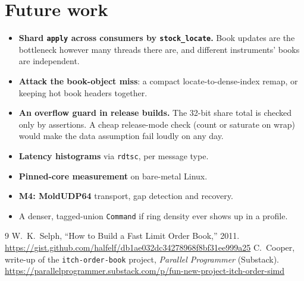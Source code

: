 \documentclass[10pt,a4paper]{article}
\newcommand{\code}[1]{\texttt{#1}}
\begin{document}
\section{Future work}
\label{sec:future}
\begin{itemize}
  \item \textbf{Shard \code{apply} across consumers by \code{stock\_locate}.} Book updates are the bottleneck however many threads there are,
        and different instruments' books are independent.
  \item \textbf{Attack the book-object miss}: a compact locate-to-dense-index remap, or keeping hot book headers together.
  \item \textbf{An overflow guard in release builds.} The 32-bit share total is checked only by assertions. A cheap release-mode check (count or saturate on wrap) would make the data assumption fail loudly on any day.
  \item \textbf{Latency histograms} via \code{rdtsc}, per message type.
  \item \textbf{Pinned-core measurement} on bare-metal Linux.
  \item \textbf{M4: MoldUDP64} transport, gap detection and recovery.
  \item A denser, tagged-union \code{Command} if ring density ever shows up in a profile.
\end{itemize}

\begin{thebibliography}{9}
 W.~K.~Selph, ``How to Build a Fast Limit Order Book,'' 2011. \url{https://gist.github.com/halfelf/db1ae032dc34278968f8bf31ee999a25}
 C.~Cooper, write-up of the \code{itch-order-book} project, \emph{Parallel Programmer} (Substack). \url{https://parallelprogrammer.substack.com/p/fun-new-project-itch-order-simd}
\end{thebibliography}

\appendix
\end{document}
